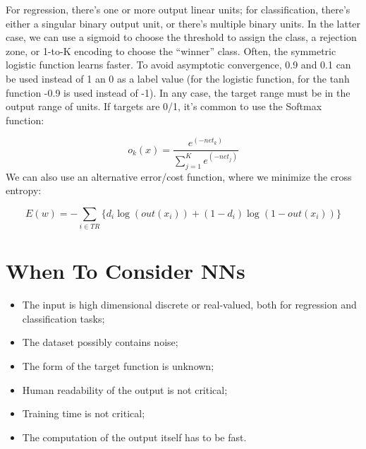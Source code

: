 For regression, there's one or more output linear units; for classification, there's either a singular binary output unit, or there's multiple binary units. In the latter case, we can use a sigmoid to choose the threshold to assign the class, a rejection zone, or 1-to-K encoding to choose the ``winner'' class. Often, the symmetric logistic function learns faster. To avoid asymptotic convergence, 0.9 and 0.1 can be used instead of 1 an 0 as a label value (for the logistic function, for the tanh function -0.9 is used instead of -1). In any case, the target range must be in the output range of units. If targets are 0/1, it's common to use the Softmax function:

\begin{equation*}
    o_k(x) = \dfrac{e^{(-net_k)}}{\sum_{j=1}^Ke^{(-net_j)}}
\end{equation*}
We can also use an alternative error/cost function, where we minimize the cross entropy:

\begin{equation*}
   E(w) = - \sum_{i \in TR} \{ d_i \log (out(x_i)) + (1-d_i) \log(1-out(x_i)) \}
\end{equation*}



\section{When To Consider NNs}

\begin{itemize}
    \item The input is high dimensional discrete or real-valued, both for regression and classification tasks;

    \item The dataset possibly contains noise;

    \item The form of the target function is unknown;

    \item Human readability of the output is not critical;

    \item Training time is not critical;
    
    \item The computation of the output itself has to be fast.
\end{itemize}